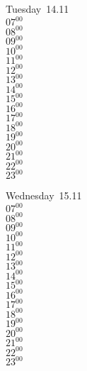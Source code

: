 \documentclass[11pt, a4paper]{book}\usepackage[]{graphicx}\usepackage[]{color}
\begin{document}
\begin{weekdaybox}
  Tuesday~14.11\\
  { 
  \vfill
  $07^{00}$\\
$08^{00}$\\
$09^{00}$\\
$10^{00}$\\
$11^{00}$\\
$12^{00}$\\
$13^{00}$\\
$14^{00}$\\
$15^{00}$\\
$16^{00}$\\
$17^{00}$\\
$18^{00}$\\
$19^{00}$\\
$20^{00}$\\
$21^{00}$\\
$22^{00}$\\
$23^{00}$\\
  }
\end{weekdaybox}
\begin{weekdaybox}
  Wednesday~15.11\\
  { 
  \vfill
  $07^{00}$\\
$08^{00}$\\
$09^{00}$\\
$10^{00}$\\
$11^{00}$\\
$12^{00}$\\
$13^{00}$\\
$14^{00}$\\
$15^{00}$\\
$16^{00}$\\
$17^{00}$\\
$18^{00}$\\
$19^{00}$\\
$20^{00}$\\
$21^{00}$\\
$22^{00}$\\
$23^{00}$\\
  }
\end{weekdaybox}
\clearpage
\begin{headerbox}
\end{headerbox}
\end{document}

